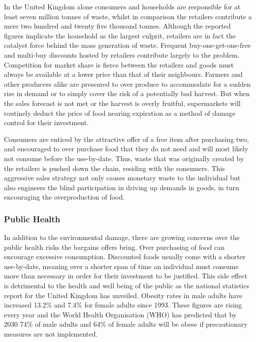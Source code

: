\documentclass[a4paper, 11pt]{article}
\begin{document}
In the United Kingdom alone consumers and households are responsible for at least seven million tonnes of waste, whilst in comparison the retailers contribute a mere two hundred and twenty five thousand tonnes. Although the reported figures implicate the household as the largest culprit, retailers are in fact the catalyst force behind the mass generation of waste. Frequent buy-one-get-one-free and multi-buy discounts hosted by retailers contribute largely to the problem. Competition for market share is fierce between the retailers and goods must always be available at a lower price than that of their neighbours. Farmers and other producers alike are pressured to over produce to accommodate for a sudden rise in demand or to simply cover the risk of a potentially bad harvest. But when the sales forecast is not met or the harvest is overly fruitful, supermarkets will routinely deduct the price of food nearing expiration as a method of damage control for their investment. 

Consumers are enticed by the attractive offer of a free item after purchasing two, and encouraged to over purchase food that they do not need and will most likely not consume before the use-by-date. Thus, waste that was originally created by the retailers is pushed down the chain, residing with the consumers. This aggressive sales strategy not only causes monetary waste to the individual but also engineers the blind participation in driving up demands in goods, in turn encouraging the overproduction of food. 


\subsubsection{Public Health}
In addition to the environmental damage, there are growing concerns over the public health risks the bargains offers bring. Over purchasing of food can encourage excessive consumption. Discounted foods usually come with a shorter use-by-date, meaning over a shorter span of time an individual must consume more than necessary in order for their investment to be justified. This side effect is detrimental to the health and well being of the public as the national statistics report for the United Kingdom has unveiled. Obesity rates in male adults have increased 13.2\% and 7.4\% for female adults since 1993. These figures are rising every year and the World Health Organisation (WHO) has predicted that by 2030 74\% of male adults and 64\% of female adults will be obese if precautionary measures are not implemented. 
\end{document}
